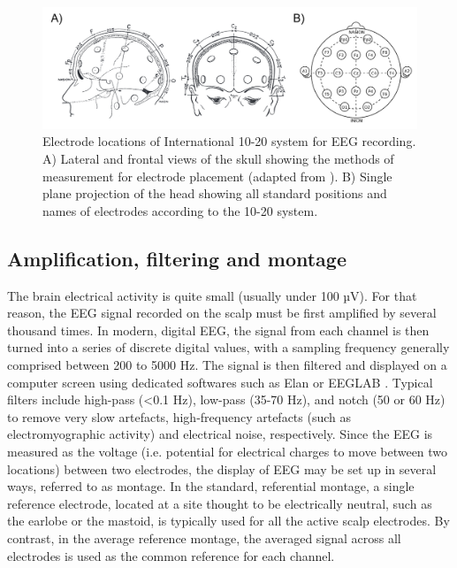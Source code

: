 \begin{figure}[htb]
	\includegraphics[width=\textwidth]{Fig/Methods/EEG_10-20/EEG_10-20.png}
	\caption[Electrode locations of International 10-20 system for EEG recording]{Electrode locations of International 10-20 system for EEG recording. A) Lateral and frontal views of the skull showing the methods of measurement for electrode placement (adapted from \citealp{klem_ten-twenty_1999}). B) Single plane projection of the head showing all standard positions and names of electrodes according to the 10-20 system. }
	\label{fig:methods:10-20}
\end{figure}

\subsection{Amplification, filtering and montage}
\label{sec:eeg:eeg:ampli}

The brain electrical activity is quite small (usually under 100 µV). For that reason, the EEG signal recorded on the scalp must be first amplified by several thousand times. In modern, digital EEG, the signal from each channel is then turned into a series of discrete digital values, with a sampling frequency generally comprised between 200 to 5000 Hz. The signal is then filtered and displayed on a computer screen using dedicated softwares such as Elan \citep{aguera_elan:_2011} or EEGLAB \citep{delorme_eeglab:_2004}. Typical filters include high-pass (<0.1 Hz), low-pass (35-70 Hz), and notch (50 or 60 Hz) to remove very slow artefacts, high-frequency artefacts (such as electromyographic activity) and electrical noise, respectively.
Since the EEG is measured as the voltage (i.e. potential for electrical charges to move between two locations) between two electrodes, the display of EEG may be set up in several ways, referred to as montage. In the standard, referential montage, a single reference electrode, located at a site thought to be electrically neutral, such as the earlobe or the mastoid, is typically used for all the active scalp electrodes. By contrast, in the average reference montage, the averaged signal across all electrodes is used as the common reference for each channel.

